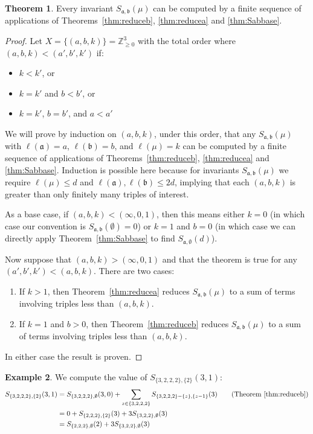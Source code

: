 \documentclass[thesis]{thesis-umich}           %
\newcommand{\Z}{\ensuremath{\mathbb{Z}}}
\renewcommand{\a}{\mathfrak a}
\renewcommand{\b}{\mathfrak b}
\theoremstyle{definition}
\newtheorem{thm}{Theorem}[section]
\newtheorem{eg}[thm]{Example}
\begin{document}
\begin{thm}
  Every invariant $S_{\a,\b}(\mu)$ can be computed by
  a finite
  sequence of applications of Theorems~\ref{thm:reduceb}, \ref{thm:reducea} and \ref{thm:Sabbase}.
  \end{thm}
\begin{proof}
  Let $X=\{(a,b,k)\}=\Z_{\geq 0}^3$ with the total order where
  $(a,b,k)<(a',b',k')$
  if:
  \begin{itemize}
  \item $k<k'$, or
  \item $k=k'$ and $b<b'$, or
    \item $k=k'$, $b=b'$, and $a<a'$
  \end{itemize}
  We will prove by induction on $(a,b,k)$, under this order, that
  any $S_{\a,\b}(\mu)$ with $\ell(\a)=a$, $\ell(\b)=b$, and $\ell(\mu)=k$
  can be computed by a finite sequence of applications
  of Theorems~\ref{thm:reduceb}, \ref{thm:reducea} and \ref{thm:Sabbase}.
  Induction is possible here because for invariants $S_{\a,\b}(\mu)$
  we require $\ell(\mu)\leq d$ and $\ell(\a),\ell(\b)\leq 2d$, implying
  that each $(a,b,k)$ is greater than only finitely many triples
  of interest.
  
  As a base case, if $(a,b,k)<(\infty,0,1)$, then
  this means either $k=0$ (in which case
  our convention is $S_{\a,\b}(\emptyset)=0$) or $k=1$ and $b=0$
  (in which case we can directly apply Theorem~\ref{thm:Sabbase} to find
  $S_{\a,\emptyset}(d)$).

  Now suppose that $(a,b,k)>(\infty,0,1)$
  and that the theorem is true for any $(a',b',k')<(a,b,k)$. There are two cases:
  \begin{enumerate}
  \item If $k>1$, then Theorem~\ref{thm:reducea} reduces $S_{\a,\b}(\mu)$ to
    a sum of terms involving triples less than $(a,b,k)$.
  \item If $k=1$ and $b>0$, then Theorem~\ref{thm:reduceb} reduces
    $S_{\a,\b}(\mu)$ to a sum of terms involving triples less than $(a,b,k)$.
  \end{enumerate}
  In either case the result is proven.
\end{proof}

\begin{eg}
  We compute the value of $S_{\{3,2,2,2\},\{2\}}(3,1)$:
  \begin{align*}
    S_{\{3,2,2,2\},\{2\}}(3,1) &= S_{\{3,2,2,2\},\emptyset}(3,0)+\sum_{z\in\{3,2,2,2\}}S_{\{3,2,2,2\}-\{z\},\{z-1\}}(3) \tag*{(Theorem~\ref{thm:reduceb})} \\
    &=0+S_{\{2,2,2\},\{2\}}(3)+3S_{\{3,2,2\},\emptyset}(3) \\
    &=S_{\{2,2,2\},\emptyset}(2)+3S_{\{3,2,2\},\emptyset}(3)
  \end{align*}
\end{eg}
\end{document}

